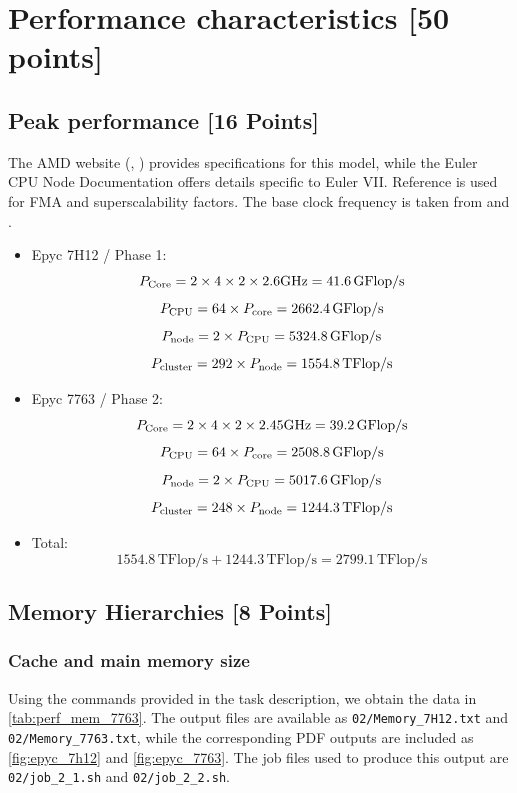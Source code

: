\documentclass[unicode,10pt,a4paper,oneside,numbers=endperiod,openany]{scrartcl}
\begin{document}
\section{Performance characteristics [50 points]}

\subsection{Peak performance [16 Points]}

The AMD website (\cite{amd_epyc_7763_spec}, \cite{amd_epyc_7H12_spec}) provides specifications for this model, while the Euler CPU Node Documentation \cite{euler_docs} offers details specific to Euler VII. Reference \cite{uops} is used for FMA and superscalability factors. The base clock frequency is taken from \cite{amd_epyc_7H12_spec} and \cite{amd_epyc_7763_spec}.
\begin{itemize}
\item Epyc 7H12 / Phase 1:
$$P_\textup{Core} = 2 \times 4 \times 2 \times 2.6 \textup{GHz} = 41.6\,\mathrm{GFlop/s}$$
$$P_\textup{CPU} = 64 \times P_\textup{core} = 2662.4\,\mathrm{GFlop/s}$$
$$P_\textup{node} = 2 \times P_\textup{CPU} = 5324.8\,\mathrm{GFlop/s}$$
$$P_\textup{cluster} = 292 \times P_\textup{node} = 1554.8\,\mathrm{TFlop/s}$$

\item Epyc 7763 / Phase 2:
  $$P_\textup{Core} = 2 \times 4 \times 2 \times 2.45 \textup{GHz} = 39.2\,\mathrm{GFlop/s}$$
  $$P_\textup{CPU} = 64 \times P_\textup{core} = 2508.8\,\mathrm{GFlop/s}$$
  $$P_\textup{node} = 2 \times P_\textup{CPU} = 5017.6\,\mathrm{GFlop/s}$$
  $$P_\textup{cluster} = 248 \times P_\textup{node}  = 1244.3\,\mathrm{TFlop/s}$$

\item Total:
  $$1554.8\,\mathrm{TFlop/s} + 1244.3\,\mathrm{TFlop/s} = 2799.1\,\mathrm{TFlop/s}$$

\end{itemize}

\subsection{Memory Hierarchies [8 Points]}
\subsubsection{Cache and main memory size}
Using the commands provided in the task description, we obtain the data in \autoref{tab:perf_mem_7763}. The output files are available as \texttt{02/Memory\_7H12.txt} and \texttt{02/Memory\_7763.txt}, while the corresponding PDF outputs are included as \ref{fig:epyc_7h12} and \ref{fig:epyc_7763}. The job files used to produce this output are \texttt{02/job\_2\_1.sh} and \texttt{02/job\_2\_2.sh}.
\end{document}
